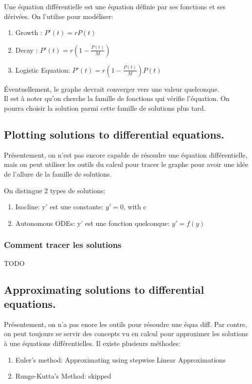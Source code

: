 \documentclass{article}
\begin{document}
Une équation différentielle est une équation définie par ses fonctions
et ses dérivées. On l'utilise pour modéliser:
\begin{enumerate}
    \item Growth : $ P'(t) = r P(t)$
    \item Decay : $ P'(t) = r (1- \frac{P(t)}{M})$
    \item Logistic Equation: $ P'(t) = r (1- \frac{P(t)}{M})P(t)$
\end{enumerate}

Éventuellement, le graphe devrait converger vers une valeur quelconque.\\

Il est à noter qu'on cherche la famille de fonctions qui vérifie l'équation.
 On pourra choisir la solution parmi cette famille de solutions plus tard.

\subsection{Plotting solutions to differential equations. }

Présentement, on n'est pas encore capable de résoudre une équation
différentielle, mais on peut utiliser les outils du calcul pour tracer
le graphe pour avoir une idée de l'allure de la famille de solutions.

On distingue 2 types de solutions:
\begin{enumerate}
    \item Isocline: y' est une constante: $ y' = 0$, with c
    \item Autonomous ODEs: y' est une fonction quelconque: $ y' = f(y)$
\end{enumerate}

\subsubsection{Comment tracer les solutions}

TODO

\subsection{Approximating solutions to differential equations. }

Présentement, on n'a pas enore les outils pour résoudre une équa diff.
Par contre, on peut toujours se servir des concepts vu en calcul pour
approximer les solutions à une équations différentielles. Il existe
plusieurs méthodes:
\begin{enumerate}
    \item Euler's method: Approximating using stepwise Linear Approximations
    \item Runge-Kutta's Method: skipped
\end{enumerate}
\end{document}
